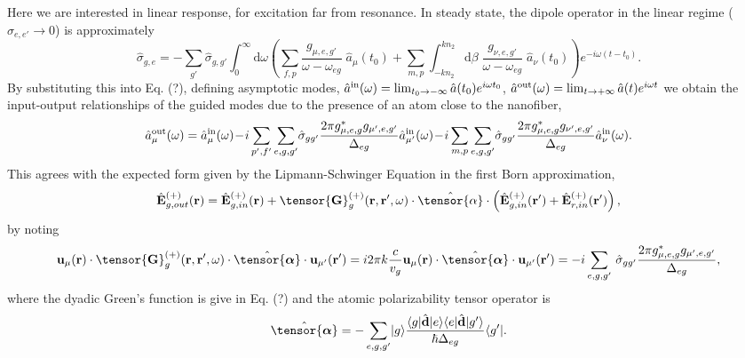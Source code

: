 \documentclass[preprint,aps,pra,onecolumn]{revtex4-1} %
\newcommand{\inp}{{\rm in}}
\newcommand{\out}{{\rm out}}
\begin{document}
Here we are interested in linear response, for excitation far from resonance.  In steady state, the dipole 
operator in the linear regime ($\hat{\sigma}_{e,e'} \rightarrow 0 $) is approximately
\begin{equation}
\hat{\sigma}_{g,e} =  -\sum_{g'} \hat{\sigma}_{g,g'}\int_0^{\infty}\mathrm{d}\omega \left(\sum_{f,p}  
\frac{g_{\mu, e,g'}}{\omega-\omega_{eg}}\; \hat{a}_\mu (t_0)+\sum_{m,p}  
\int_{-kn_2}^{kn_2}\mathrm{d}\beta \; \frac{g_{\nu, e,g'}}{\omega-\omega_{eg}} \;\hat{a}_\nu (t_0)  
\right)e^{-i\omega (t-t_0)} .
\end{equation}
By substituting this into Eq. (?), defining asymptotic modes, $\hat{a}^{\inp}(\omega) = \lim_{t_0\rightarrow 
-\infty} \hat{a}(t_0) e^{i\omega t_0}$, $\hat{a}^{\out}(\omega) = \lim_{t\rightarrow +\infty} \hat{a}(t) 
e^{i\omega t}$ we obtain the input-output relationships of the guided modes due to the presence of an 
atom close to the nanofiber,
\begin{equation}
\hat{a}^{\out}_\mu (\omega) = \hat{a}^{\inp}_\mu (\omega) \!-\! i\sum_{p',f'} 
\sum_{e,g,g'}\!\hat{\sigma}_{gg'}\frac{2\pi g_{\mu,e,g}^* 
g_{\mu',e,g'}}{\Delta_{eg}}\hat{a}^{\inp}_{\mu'}(\omega) \!-\! i\sum_{m,p} 
\sum_{e,g,g'}\!\hat{\sigma}_{gg'}\frac{2\pi  g_{\mu,e,g}^* 
g_{\nu',e,g'}}{\Delta_{eg}}\hat{a}^{\inp}_{\nu}(\omega).
\end{equation}
This agrees with the expected form given by the Lipmann-Schwinger Equation in the first Born 
approximation,
\begin{equation}
\hat{\mathbf{E}}^{(+)}_{g,out}(\br)=\hat{\mathbf{E}}^{(+)}_{g, 
in}(\br)+\tensor{\mathbf{G}}_g^{(+)}(\br,\br',\omega)\cdot\hat{\tensor{\alpha}}\cdot 
\left(\hat{\mathbf{E}}^{(+)}_{g, in}(\br')+\hat{\mathbf{E}}^{(+)}_{r, in}(\br')\right),
\end{equation}
by noting
\begin{equation}
 \mathbf{u}_{\mu} (\br)\cdot \tensor{\mathbf{G}}_g^{(+)}(\br,\br',\omega)\cdot 
 \hat{\tensor{\boldsymbol{\alpha}}}\cdot \mathbf{u}_{\mu'} (\br') = i 2\pi k\frac{c}{v_g} \mathbf{u}_\mu 
 (\br) \cdot \hat{\tensor{\boldsymbol{\alpha}}}\cdot \mathbf{u}_{\mu'} (\br') = - i \sum_{e,g,g'}\!\ 
 \hat{\sigma}_{gg'} \frac{2\pi g_{\mu,e,g}^* g_{\mu',e,g'}}{\Delta_{eg}},
\end{equation}
where the dyadic Green's function is give in Eq. (?) and the atomic polarizability tensor operator is
\begin{equation}
\hat{\tensor{\boldsymbol{\alpha}}} = -\sum_{e,g,g'}\ket{g}\frac{\bra{g}\hat{\mathbf{d}}\ket{e}\bra{e} 
\hat{\mathbf{d}}\ket{g'}}{\hbar \Delta_{eg}}\bra{g'}.
\end{equation}
\end{document}
